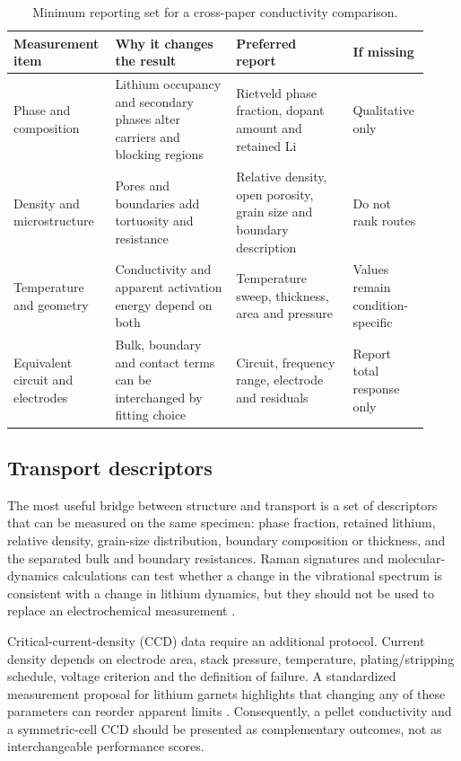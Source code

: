 \begin{table}[t]
\centering
\caption{Minimum reporting set for a cross-paper conductivity comparison.}
\label{tab:comparability}
\begin{tabular}{P{0.22\linewidth}P{0.28\linewidth}P{0.27\linewidth}P{0.15\linewidth}}
\toprule
Measurement item & Why it changes the result & Preferred report & If missing \\
\midrule
Phase and composition & Lithium occupancy and secondary phases alter carriers and blocking regions & Rietveld phase fraction, dopant amount and retained Li & Qualitative only \cite{anderson2024comprehensive,li2026structure} \\
Density and microstructure & Pores and boundaries add tortuosity and resistance & Relative density, open porosity, grain size and boundary description & Do not rank routes \cite{heo2021microstructural,gao2021revealing} \\
Temperature and geometry & Conductivity and apparent activation energy depend on both & Temperature sweep, thickness, area and pressure & Values remain condition-specific \cite{grissa2020impact,ilina2023recent} \\
Equivalent circuit and electrodes & Bulk, boundary and contact terms can be interchanged by fitting choice & Circuit, frequency range, electrode and residuals & Report total response only \cite{klimpel2023standardizing,zhao2024review} \\
\bottomrule
\end{tabular}
\end{table}

\subsection{Transport descriptors}

The most useful bridge between structure and transport is a set of descriptors that can be measured on the same specimen: phase fraction, retained lithium, relative density, grain-size distribution, boundary composition or thickness, and the separated bulk and boundary resistances. Raman signatures and molecular-dynamics calculations can test whether a change in the vibrational spectrum is consistent with a change in lithium dynamics, but they should not be used to replace an electrochemical measurement \cite{miyagawa2026raman,kulkarni2025machine,ilina2023recent}.

Critical-current-density (CCD) data require an additional protocol. Current density depends on electrode area, stack pressure, temperature, plating/stripping schedule, voltage criterion and the definition of failure. A standardized measurement proposal for lithium garnets highlights that changing any of these parameters can reorder apparent limits \cite{klimpel2023standardizing,sarkar2022critical}. Consequently, a pellet conductivity and a symmetric-cell CCD should be presented as complementary outcomes, not as interchangeable performance scores.

